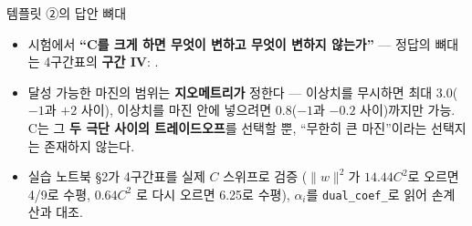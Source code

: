\begin{frame}{템플릿 ②의 답안 뼈대}
  \begin{itemize}
    \item 시험에서 \textbf{``C를 크게 하면 무엇이 변하고 무엇이
      변하지 않는가''} --- 정답의 뼈대는 4구간표의 \textbf{구간
      IV}: .
    \item 달성 가능한 마진의 범위는 \textbf{지오메트리가} 정한다
      --- 이상치를 무시하면 최대 3.0($-1$과 $+2$ 사이), 이상치를
      마진 안에 넣으려면 0.8($-1$과 $-0.2$ 사이)까지만 가능.
      C는 그 \textbf{두 극단 사이의 트레이드오프}를 선택할
      뿐, ``무한히 큰 마진''이라는 선택지는 존재하지 않는다.
    \item 실습 노트북 §2가 4구간표를 실제 $C$ 스위프로 검증
      ($\|w\|^2$가 $14.44C^2$로 오르면 4/9로 수평, $0.64C^2$
      로 다시 오르면 6.25로 수평), $\alpha_i$를
      \texttt{dual\_coef\_}로 읽어 손계산과 대조.
  \end{itemize}
\end{frame}
